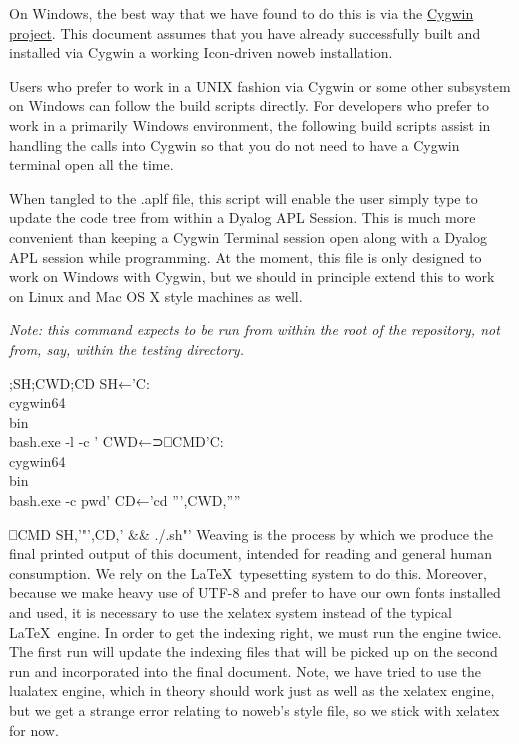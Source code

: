 \documentclass{article}%
\begin{document}
On Windows, the best way that we have found to do this is 
via the \href{https://www.cygwin.com/}{Cygwin project}. 
This document assumes that you have already successfully built and 
installed via Cygwin a working Icon-driven noweb installation.

Users who prefer to work in a UNIX fashion via Cygwin or some other 
subsystem on Windows can follow the build scripts directly.
For developers who prefer to work in a primarily Windows environment,
the following build scripts assist in handling the calls into Cygwin 
so that you do not need to have a Cygwin terminal open all the time. 

When tangled to the {\Tt{}.aplf\nwendquote} file, this script will enable the 
user simply type {\Tt{}\nwendquote} to update the code tree from within a 
Dyalog APL Session.
This is much more convenient than keeping a Cygwin Terminal 
session open along with a Dyalog APL session while programming.
At the moment, this file is only designed to work on Windows with 
Cygwin, but we should in principle extend this to work on Linux 
and Mac OS X style machines as well.

\emph{Note: this command expects to be run from within the root of 
the repository, not from, say, within the {\Tt{}testing\nwendquote} directory.}

\nwenddocs{}\endmoddef\nwstartdeflinemarkup\nwenddeflinemarkup
{};SH;CWD;CD
SH←'C:\\cygwin64\\bin\\bash.exe -l -c '
CWD←⊃⎕CMD'C:\\cygwin64\\bin\\bash.exe -c pwd'
CD←'cd ''',CWD,''''
  
⎕CMD SH,'"',CD,' && ./.sh"'
\eatline
{}\nwendcode{}\nwdocspar
Weaving is the process by which we produce the final printed output 
of this document,
intended for reading and general human consumption.
We rely on the \LaTeX\ typesetting system to do this.
Moreover, because we make heavy use of UTF-8 and prefer to have our
own fonts installed and used, 
it is necessary to use the {\Tt{}xelatex\nwendquote} system instead of the typical 
\LaTeX\ engine. 
In order to get the indexing right, we must run the engine twice. 
The first run will update the indexing files that will be picked 
up on the second run and incorporated into the final document.
Note, we have tried to use the {\Tt{}lualatex\nwendquote} engine, which in theory 
should work just as well as the {\Tt{}xelatex\nwendquote} engine, but we get a 
strange error relating to noweb's style file, so we stick with 
{\Tt{}xelatex\nwendquote} for now.
\end{document}
